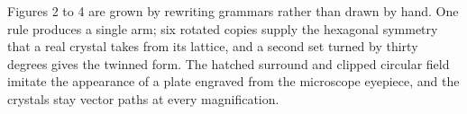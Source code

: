 \documentclass[11pt]{article}
\begin{document}
\vspace{1.6em}
\begin{center}
\end{center}

\vspace{.6em}
\footnotesize\noindent
Figures 2 to 4 are grown by rewriting grammars rather than drawn by hand. One
rule produces a single arm; six rotated copies supply the hexagonal symmetry
that a real crystal takes from its lattice, and a second set turned by thirty
degrees gives the twinned form. The hatched surround and clipped
circular field imitate the appearance of a plate engraved from the microscope
eyepiece, and the crystals stay vector paths at every magnification.
\end{document}
